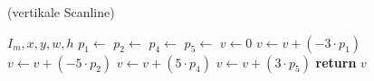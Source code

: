 \begin{algorithm}[!ht]
\caption{ (vertikale Scanline)}
\label{alg:convolutekernel-vertical}
\begin{algorithmic}[1]
	\Require $I_m,x,y,w,h$
	\State $p_1 \gets$ 
	\State $p_2 \gets$ 
	\State $p_4 \gets$ 
	\State $p_5 \gets$ 
	\State $v \gets 0$
	\State $v \gets v + \left( -3 \cdot p_1 \right)$
	\State $v \gets v + \left( -5 \cdot p_2 \right)$
	\State $v \gets v + \left( 5 \cdot p_4 \right)$
	\State $v \gets v + \left( 3 \cdot p_5 \right)$
	\State \textbf{return} $v$
\end{algorithmic}
\end{algorithm}
